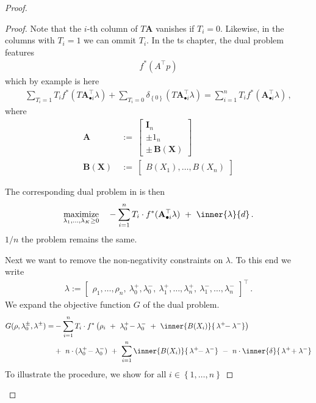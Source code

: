 \begin{proof}
\begin{proof}
Note that the $i$-th column of $T\mathbf{A}$ vanishes if 
$T_i=0$. Likewise, in the columns with $T_i=1$ we can ommit $T_i$.
In the ts chapter, the dual problem features
\begin{gather}
  f^*(A^\top p)
\end{gather}
which by example is here
\begin{gather*}
  \sum_{T_i=1} T_i f^*(T\mathbf{A}_{\bullet i}^\top\lambda)
  +
  \sum_{T_i=0} 
  \delta_{\left\{ 0 \right\}}
(T\mathbf{A}_{\bullet i}^\top\lambda)
  =
  \sum_{i=1}^n T_i f^*(\mathbf{A}_{\bullet i}^\top\lambda)
  \,,
\end{gather*}
where
\begin{align*}
    \mathbf{A}
    &
    \ 
    :=
    \ 
    \begin{bmatrix}
      \mathbf{I}_n
      \\
      \pm
      \mathrm{1}_n
      \\
      \pm\,\mathbf{B}(\mathbf{X})
    \end{bmatrix}
    \\
    \mathbf{B}(\mathbf{X})
    &
    \ 
    :=
    \ 
    \begin{bmatrix}
      B(X_1), \ldots, B(X_n)
    \end{bmatrix}
\end{align*}


The corresponding dual problem in \cite{Tseng1991} is then
\begin{gather*}
  \underset
  {\lambda_1,\ldots,\lambda_{K}\ge 0}
  {
  \mathrm{maximize}
  }
  \quad
  -
  \sum_{i=1} 
  ^n
  T_i
  \cdot
  f^*
(\mathbf{A}_{\bullet i}^\top\lambda)
  \ 
  +
  \ 
  \inner{\lambda}{d}
  \,.
\end{gather*}
  $1/n$ the problem remains the same.

  Next we want to remove the non-negativity constraints on $\lambda$.
  To this end we write
  \begin{gather}
    \lambda
    :=
    \begin{bmatrix}
      \rho_1,
      \ldots,
      \rho_n,
      \ 
      \lambda_0^+,
      \lambda_0^-,
      \ 
      \lambda_1^+,
      \ldots,
      \lambda_n^+,
      \ 
      \lambda_1^-,
      \ldots,
      \lambda_n^-
    \end{bmatrix}
    ^\top
    \,.
  \end{gather}
  We expand the objective function $G$ of the dual problem.
  \begin{align*}
    G
    (
    \rho,
    \lambda_0^\pm,
    \lambda^\pm
    )
    =
  &-
  \sum_{i=1} 
  ^n
  T_i
  \cdot
  f^*
  \left( 
\rho_i
\ 
+
\ 
\lambda_0^+
\!
-
\lambda_0^-
\ 
+
\ 
\inner
{B(X_i)}
{\,\lambda^+ \!\!- \lambda^-}
  \right)
  \\
  &+
  \ 
  n
  \cdot
  (
\lambda_0^+
\!
-
\lambda_0^-
  )
  \ 
+
  \ 
  \sum_{i=1} 
  ^n
\inner
{B(X_i)}
{\,\lambda^+ \!\!- \lambda^-}
  \ 
-
  \ 
  n
  \cdot
\inner
{\delta}
{\,\lambda^+ \!+ \lambda^-}
  \end{align*}
  To illustrate the procedure, we show 
  for all $i \in \left\{ 1,\ldots,n \right\}$



\end{proof}
\end{proof}
